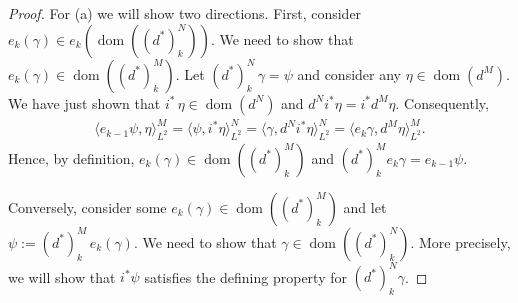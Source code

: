 \documentclass[11pt]{article}
\theoremstyle{definition}
\theoremstyle{remark}
\DeclareMathOperator\dom{dom}
\begin{document}
\begin{proof}
    For (a) we will show two directions. First, consider $e_k(\gamma) \in e_k(\dom((d^*)_k^N))$. We need to show that $e_k(\gamma) \in \dom((d^*)_k^M)$. Let $(d^*)_k^N \, \gamma = \psi$ and consider any $\eta \in \dom(d^M)$. We have just shown that $i^* \, \eta \in \dom(d^N)$ and $d^N i^* \eta = i^* d^M \eta$. Consequently,
    \begin{align}
        \langle e_{k-1} \psi , \eta \rangle_{L^2}^M = \langle \psi, i^* \eta \rangle_{L^2}^N = \langle \gamma, d^N i^* \eta \rangle_{L^2}^N = \langle e_k \gamma , d^M \eta\rangle_{L^2}^M. \label{eq:showsb}
    \end{align}
    Hence, by definition, $e_k(\gamma) \in \dom((d^*)_k^M)$ and $(d^*)_k^M e_k \gamma = e_{k-1} \psi$.
    
    Conversely, consider some $e_k (\gamma) \in \dom((d^*)_k^M)$ and let $\psi := (d^*)_k^M \, e_k (\gamma)$. We need to show that $\gamma \in \dom((d^*)_k^N)$. More precisely, we will show that $i^* \psi$ satisfies the defining property for $(d^*)_k^N \gamma$.
    

\end{proof}
\end{document}
